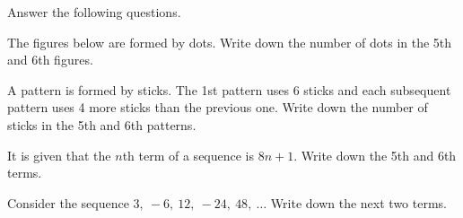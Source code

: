  Answer the following questions.

\begin{subparts}
  \item The figures below are formed by dots. Write down the number of dots in the 5th and 6th figures.
  \par\noindent\hspace*{5em}%
  \par

  \item A pattern is formed by sticks. The 1st pattern uses 6 sticks and each subsequent pattern uses 4 more sticks than the previous one. Write down the number of sticks in the 5th and 6th patterns.

  \item It is given that the $n$th term of a sequence is $8n+1$. Write down the 5th and 6th terms.

  \item Consider the sequence $3,\ -6,\ 12,\ -24,\ 48,\ \ldots$ Write down the next two terms.
\end{subparts}

